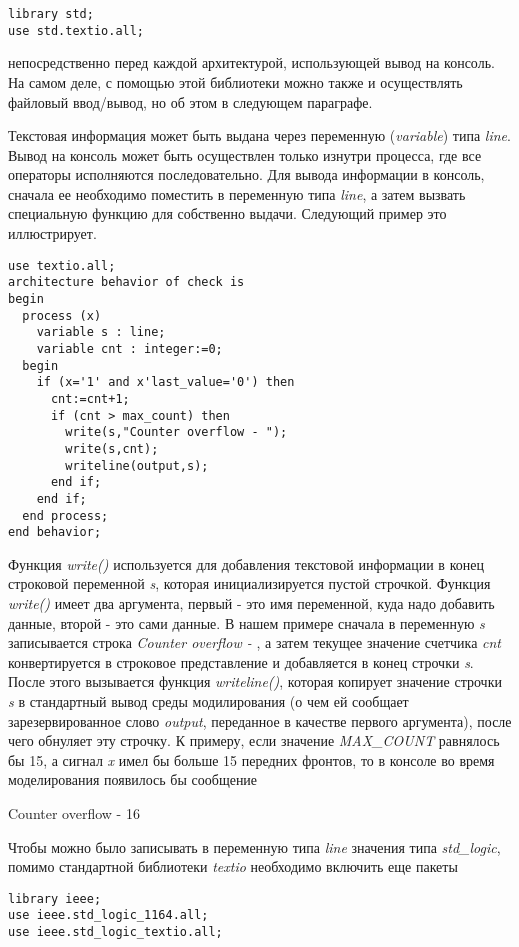 \begin{lstlisting}
library std;
use std.textio.all;
\end{lstlisting}
непосредственно перед каждой архитектурой, использующей вывод на консоль. На самом деле, с помощью этой библиотеки можно также и осуществлять файловый ввод/вывод, но об этом в следующем параграфе.

Текстовая информация может быть выдана через переменную (\emph{variable}) типа \emph{line}. Вывод на консоль может быть осуществлен только изнутри процесса, где все операторы исполняются последовательно. Для вывода информации в консоль, сначала ее необходимо поместить в переменную типа \emph{line}, а затем вызвать специальную функцию для собственно выдачи. Следующий пример это иллюстрирует.

\begin{Code}
\begin{lstlisting}[caption=Вывод в консоль]
use textio.all;
architecture behavior of check is
begin
  process (x)
    variable s : line;
    variable cnt : integer:=0;
  begin
    if (x='1' and x'last_value='0') then
      cnt:=cnt+1;
      if (cnt > max_count) then
        write(s,"Counter overflow - ");
        write(s,cnt);
        writeline(output,s);
      end if;
    end if;
  end process;
end behavior;
\end{lstlisting}
\end{Code}


Функция \emph{write()} используется для добавления текстовой информации в конец строковой переменной \emph{s}, которая инициализируется пустой строчкой. Функция \emph{write()} имеет два аргумента, первый - это имя переменной, куда надо добавить данные, второй - это сами данные. В нашем примере сначала в переменную \emph{s} записывается строка \emph{Counter overflow - }, а затем текущее значение счетчика \emph{cnt} конвертируется в строковое представление и добавляется в конец строчки \emph{s}. После этого вызывается функция \emph{writeline()}, которая копирует значение строчки \emph{s} в стандартный вывод среды модилирования (о чем ей сообщает зарезервированное слово \emph{output}, переданное в качестве первого аргумента), после чего обнуляет эту строчку. К примеру, если значение \emph{MAX\_COUNT} равнялось бы 15, а сигнал \emph{x} имел бы больше 15 передних фронтов, то в консоле во время моделирования появилось бы сообщение

Counter overflow - 16

Чтобы можно было записывать в переменную типа \emph{line} значения типа \emph{std\_logic}, помимо стандартной библиотеки \emph{textio} необходимо включить еще пакеты
\begin{lstlisting}
library ieee;
use ieee.std_logic_1164.all;
use ieee.std_logic_textio.all;
\end{lstlisting}

